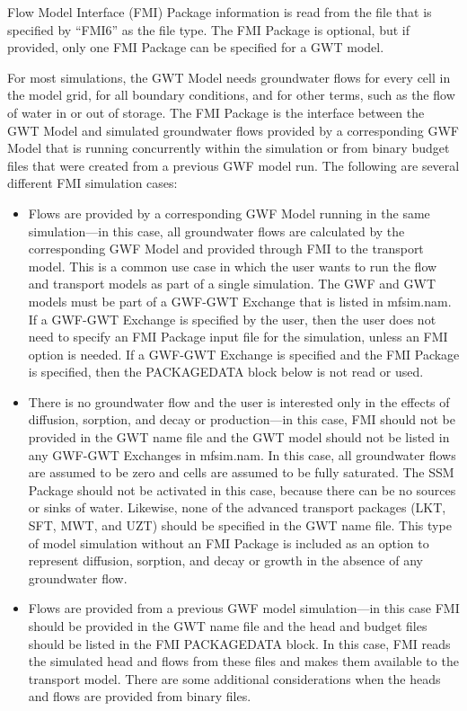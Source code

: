Flow Model Interface (FMI) Package information is read from the file that is specified by ``FMI6'' as the file type.  The FMI Package is optional, but if provided, only one FMI Package can be specified for a GWT model.

For most simulations, the GWT Model needs groundwater flows for every cell in the model grid, for all boundary conditions, and for other terms, such as the flow of water in or out of storage.  The FMI Package is the interface between the GWT Model and simulated groundwater flows provided by a corresponding GWF Model that is running concurrently within the simulation or from binary budget files that were created from a previous GWF model run.  The following are several different FMI simulation cases:

\begin{itemize}

\item Flows are provided by a corresponding GWF Model running in the same simulation---in this case, all groundwater flows are calculated by the corresponding GWF Model and provided through FMI to the transport model.  This is a common use case in which the user wants to run the flow and transport models as part of a single simulation.  The GWF and GWT models must be part of a GWF-GWT Exchange that is listed in mfsim.nam.  If a GWF-GWT Exchange is specified by the user, then the user does not need to specify an FMI Package input file for the simulation, unless an FMI option is needed.  If a GWF-GWT Exchange is specified and the FMI Package is specified, then the PACKAGEDATA block below is not read or used.

\item There is no groundwater flow and the user is interested only in the effects of diffusion, sorption, and decay or production---in this case, FMI should not be provided in the GWT name file and the GWT model should not be listed in any GWF-GWT Exchanges in mfsim.nam.  In this case, all groundwater flows are assumed to be zero and cells are assumed to be fully saturated.  The SSM Package should not be activated in this case, because there can be no sources or sinks of water.  Likewise, none of the advanced transport packages (LKT, SFT, MWT, and UZT) should be specified in the GWT name file.  This type of model simulation without an FMI Package is included as an option to represent diffusion, sorption, and decay or growth in the absence of any groundwater flow.

\item Flows are provided from a previous GWF model simulation---in this case FMI should be provided in the GWT name file and the head and budget files should be listed in the FMI PACKAGEDATA block.  In this case, FMI reads the simulated head and flows from these files and makes them available to the transport model.  There are some additional considerations when the heads and flows are provided from binary files.


\end{itemize}
